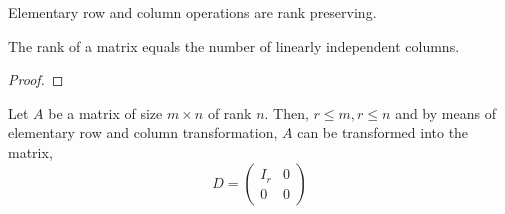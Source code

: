 \begin{Corollary}
    Elementary row and column operations are rank preserving.
\end{Corollary}
\begin{Theorem}
    The rank of a matrix equals the number of linearly independent columns.
\end{Theorem}
\begin{proof}
\end{proof}
\begin{Theorem}
    Let $A$ be a matrix of size $m\times n$ of rank $n$. Then, $r \leq m, r\leq n$ and by means of elementary
    row and column transformation, $A$ can be transformed into the matrix,
    \begin{equation*}
	D = 
	\begin{pmatrix} 
	    I_r & 0  \\
	    0 & 0  
	\end{pmatrix}
    \end{equation*}
\end{Theorem}


\endinput
